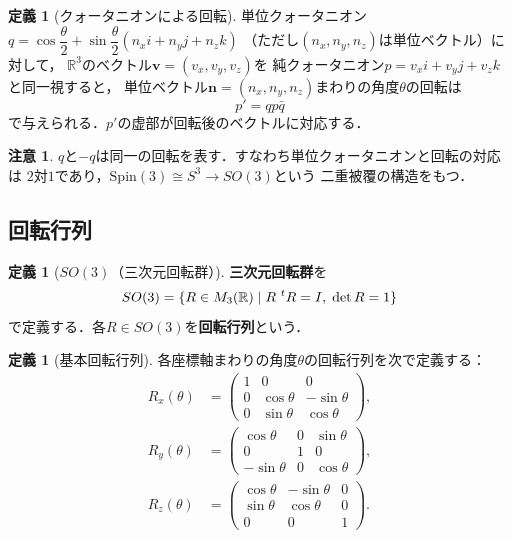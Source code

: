 \documentclass[dvipdfmx,a4paper,12pt]{jsarticle}
\theoremstyle{definition}
\newtheorem{definition}[theorem]{定義}
\newtheorem{remark}[theorem]{注意}
\begin{document}
\begin{definition}[クォータニオンによる回転]
    単位クォータニオン$q=\cos\dfrac{\theta}{2}+\sin\dfrac{\theta}{2}(n_x i+n_y j+n_z k)$
    （ただし$(n_x,n_y,n_z)$は単位ベクトル）に対して，
    $\mathbb{R}^3$のベクトル$\bm{v}=(v_x,v_y,v_z)$を
    純クォータニオン$p=v_x i+v_y j+v_z k$と同一視すると，
    単位ベクトル$\bm{n}=(n_x,n_y,n_z)$まわりの角度$\theta$の回転は
    $$p'=qp\bar{q}$$
    で与えられる．$p'$の虚部が回転後のベクトルに対応する．
\end{definition}

\begin{remark}
    $q$と$-q$は同一の回転を表す．すなわち単位クォータニオンと回転の対応は
    $2$対$1$であり，$\mathrm{Spin}(3)\cong S^3\to SO(3)$という
    二重被覆の構造をもつ．
\end{remark}

\subsection{回転行列}

\begin{definition}[$SO(3)$（三次元回転群）]
    \textbf{三次元回転群}を
    $$SO(3)=\{R\in M_3(\mathbb{R})\mid R\,\prescript{t}{}{}R=I,\;\det R=1\}$$
    で定義する．各$R\in SO(3)$を\textbf{回転行列}という．
\end{definition}

\begin{definition}[基本回転行列]
    各座標軸まわりの角度$\theta$の回転行列を次で定義する：
    \begin{align*}
        R_x(\theta)
        &=\begin{pmatrix}1&0&0\\0&\cos\theta&-\sin\theta\\0&\sin\theta&\cos\theta\end{pmatrix},\\[6pt]
        R_y(\theta)
        &=\begin{pmatrix}\cos\theta&0&\sin\theta\\0&1&0\\-\sin\theta&0&\cos\theta\end{pmatrix},\\[6pt]
        R_z(\theta)
        &=\begin{pmatrix}\cos\theta&-\sin\theta&0\\\sin\theta&\cos\theta&0\\0&0&1\end{pmatrix}.
    \end{align*}
\end{definition}
\end{document}

